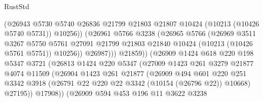 \begin{lexlean}{RustStd}
\begin{coremodule}
                                (@26943
                                  @5730
                                  @5740
                                  @26836
                                  @21799
                                  @21803
                                  @21807
                                  @10424
                                  (@10213 (@10426 @5740 @5731))
                                  @10256))
                              (@26961
                                @5766
                                @3238
                                (@26965
                                  @5766
                                  (@26969
                                    @3511
                                    @3267
                                    @5750
                                    @5761
                                    @27091
                                    @21799
                                    @21803
                                    @21840
                                    @10424
                                    (@10213 (@10426 @5761 @5751))
                                    @10256))
                                @26987)))
                          @21859))
                      (@26909
                        @1424
                        @618
                        @220
                        @198
                        @5347
                        @3721
                        (@26813
                          @1424
                          @220
                          @5347
                          (@27009
                            @1423
                            @261
                            @3279
                            @21877
                            @4074
                            @11509
                            (@26904
                              @1423
                              @261
                              @21877
                              (@26909
                                @494
                                @601
                                @220
                                @251
                                @3342
                                @3918
                                (@26791 @22 @220 @22 @3342 (@10154 (@26796 @22)) @10668)
                                @27195))
                            @17908))
                        (@26909
                          @594
                          @453
                          @196
                          @11
                          @3622
                          @3238

\end{coremodule}
\end{lexlean}
